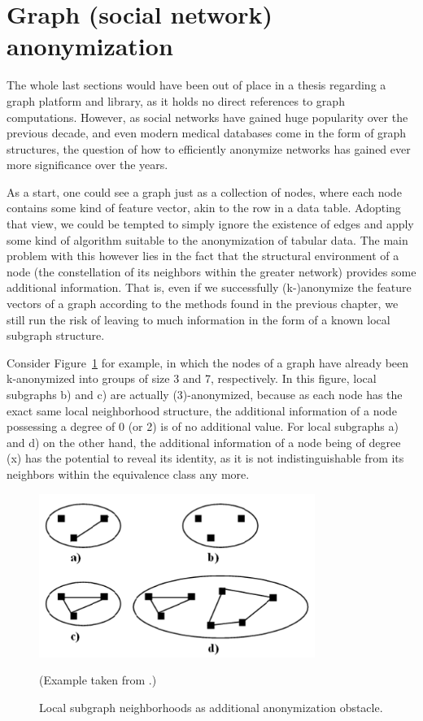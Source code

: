 	
	\section{Graph (social network) anonymization}
	\label{sect:graph_sn_anon}
	
	The whole last sections would have been out of place in a thesis regarding a graph platform and library, as it holds no direct references to graph computations. However, as social networks have gained huge popularity over the previous decade, and even modern medical databases come in the form of graph structures, the question of how to efficiently anonymize networks has gained ever more significance over the years.
	
	As a start, one could see a graph just as a collection of nodes, where each node contains some kind of feature vector, akin to the row in a data table. Adopting that view, we could be tempted to simply ignore the existence of edges and apply some kind of algorithm suitable to the anonymization of tabular data. The main problem with this however lies in the fact that the structural environment of a node (the constellation of its neighbors within the greater network) provides some additional information. That is, even if we successfully (k-)anonymize the feature vectors of a graph according to the methods found in the previous chapter, we still run the risk of leaving to much information in the form of a known local subgraph structure.
	
	Consider Figure~\ref{fig:anon_sn_problem} for example, in which the nodes of a graph have already been k-anonymized into groups of size 3 and 7, respectively. In this figure, local subgraphs b) and c) are actually (3)-anonymized, because as each node has the exact same local neighborhood structure, the additional information of a node possessing a degree of 0 (or 2) is of no additional value. For local subgraphs a) and d) on the other hand, the additional information of a node being of degree (x) has the potential to reveal its identity, as it is not indistinguishable from its neighbors within the equivalence class any more.
	
	\begin{figure}[ht]
		\begin{center}
			\includegraphics[width=0.8\textwidth]{figures/anonym/sn_problem}
			\caption{Local subgraph neighborhoods as additional anonymization obstacle.}
			\label{fig:anon_sn_problem}
		\end{center}
		\small
		(Example taken from \cite{campan2009data}.)
	\end{figure}
	
